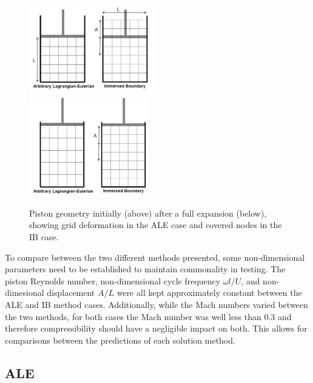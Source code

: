 \documentclass{article}
\begin{document}
\begin{figure}
  \centering
  \hspace{12pt} \includegraphics[width=0.5\textwidth]{pistonbef.png}      \\
  \includegraphics[width=0.46\textwidth]{pistonaft.png}         
  \caption{Piston geometry initially (above) after a full expansion (below), showing grid deformation in the ALE case and covered nodes in the IB case.}
  \label{fig:pistonaft}
\end{figure}


To compare between the two different methods presented, some non-dimensional parameters need to be established to maintain commonality in testing.  The piston Reynolds number, non-dimensional cycle frequency $\omega l/U$, and non-dimesional displacement $A/L$ were all kept approximately constant between the ALE and IB method cases.  Additionally, while the Mach numbers varied between the two methods, for both cases the Mach number was well less than 0.3 and therefore compressibility should have a negligible impact on both. This allows for comparisons between the predictions of each solution method.

\subsection{ALE}
\end{document}
